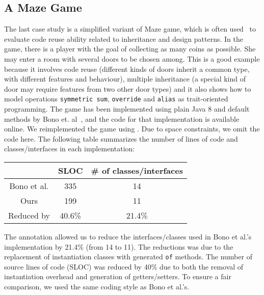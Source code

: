\subsection{A Maze Game}
The last case study is a simplified variant of Maze game, which is often
used~\cite{gof,bono14} 
to evaluate code reuse ability related to inheritance and design
patterns. In the game, there is a player with the goal of collecting
as many coins as possible. She may enter a room with several doors to
be chosen among. This is a good example because it involves code reuse
(different kinds of doors inherit a common type, with different
features and behaviour), multiple inheritance (a special kind of door
may require features from two other door types) and it also shows how
to model operations \texttt{symmetric sum}, \texttt{override} and
\texttt{alias} as trait-oriented programming. The game has been
implemented using plain Java 8 and default methods by Bono
et. al~\cite{bono14}, and the code for that implementation is
available online. We reimplemented the game using \mixin. Due to space
constraints, we omit the code here. The following table summarizes
the number of lines of code and classes/interfaces in each implementation:

\vspace{5pt}
\hspace{80pt}\begin{tabular}{ccc}
\hline
            & SLOC   & \# of classes/interfaces \\ \hline
Bono et al. & 335    & 14                       \\
Ours        & 199    & 11                       \\
\rowcolor[HTML]{C0C0C0} 
Reduced by  & 40.6\% & 21.4\%                   \\ \hline
\end{tabular}
\vspace{5pt}

\noindent The \mixin annotation allowed us to reduce the interfaces/classes used
in Bono et al.'s implementation by 21.4\% (from 14 to 11). The
reductions was due to the replacement of instantiation classes with
generated \texttt{of} methods. The number of source lines of code (SLOC)
was reduced by 40\% due to both the removal of instantiation overhead and
generation of getters/setters. %
To ensure a fair comparison, we used the same coding style as Bono et al.'s.
